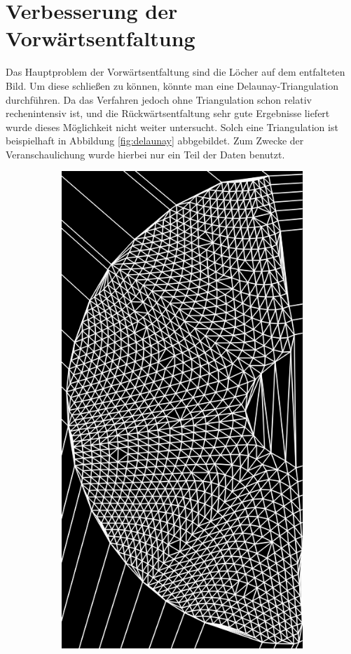 \section{Verbesserung der Vorwärtsentfaltung}
Das Hauptproblem der Vorwärtsentfaltung sind die Löcher auf dem entfalteten Bild. Um diese schließen zu können, könnte man eine Delaunay-Triangulation durchführen. 
Da das Verfahren jedoch ohne Triangulation schon relativ rechenintensiv ist, und die Rückwärtsentfaltung sehr gute Ergebnisse liefert wurde dieses Möglichkeit nicht weiter untersucht.
Solch eine Triangulation ist beispielhaft in Abbildung \ref{fig:delaunay} abbgebildet. Zum Zwecke der Veranschaulichung wurde hierbei nur ein Teil der Daten benutzt.
\begin{figure}[!htb]
	\centering
	\begin{subfigure}{.9\textwidth}
		\centering
		\includegraphics[angle=-90, width=.8\textwidth]{images/delaunay1.png}

\end{subfigure}
\end{figure}
